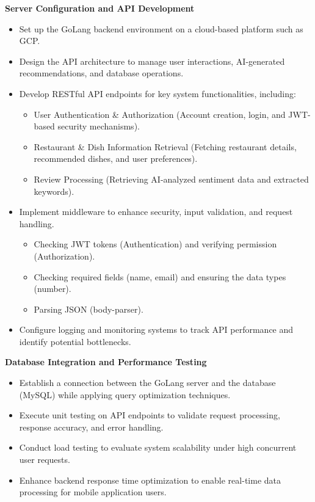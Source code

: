 \textbf{Server Configuration and API Development}
\begin{itemize}
\item Set up the GoLang backend environment on a cloud-based platform such as GCP.
\item Design the API architecture to manage user interactions, AI-generated recommendations, and database operations.
\item Develop RESTful API endpoints for key system functionalities, including:
	\begin{itemize}
	\item User Authentication \& Authorization (Account creation, login, and JWT-based security mechanisms).
	\item Restaurant \& Dish Information Retrieval (Fetching restaurant details, recommended dishes, and user preferences).
	\item Review Processing (Retrieving AI-analyzed sentiment data and extracted keywords).
	\end{itemize}
\item Implement middleware to enhance security, input validation, and request handling.
	\begin{itemize}
	\item Checking JWT tokens (Authentication) and verifying permission (Authorization).
	\item Checking required fields (name, email) and ensuring the data types (number).
	\item Parsing JSON (body-parser).
	\end{itemize}
\item Configure logging and monitoring systems to track API performance and identify potential bottlenecks.
\end{itemize}

\textbf{Database Integration and Performance Testing}
\begin{itemize}
\item Establish a connection between the GoLang server and the database (MySQL) while applying query optimization techniques.
\item Execute unit testing on API endpoints to validate request processing, response accuracy, and error handling.
\item Conduct load testing to evaluate system scalability under high concurrent user requests.
\item Enhance backend response time optimization to enable real-time data processing for mobile application users.
\end{itemize}

